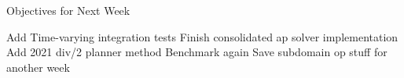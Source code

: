 \begin{frame}{Objectives for Next Week}
  \begin{outline}
  \1 Add Time-varying integration tests
  \1 Finish consolidated ap solver implementation
  \1 Add 2021 div/2 planner method
  \1 Benchmark again
  \1 Save subdomain op stuff for another week
  \end{outline}
\end{frame}
